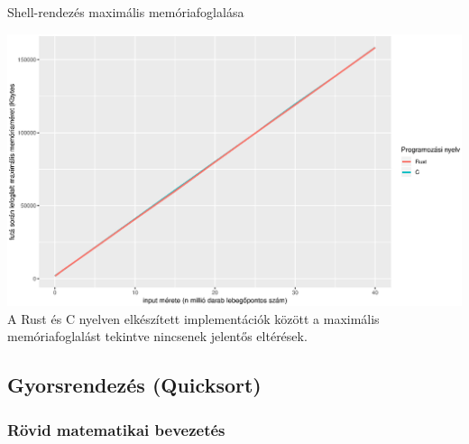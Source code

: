 Shell-rendezés maximális memóriafoglalása

\includegraphics[width=15.5cm]{kepek/shell_memory.eps}
A Rust és C nyelven elkészített implementációk között a maximális memóriafoglalást tekintve nincsenek jelentős eltérések.

\subsection{Gyorsrendezés (Quicksort)}
\subsubsection{Rövid matematikai bevezetés}
